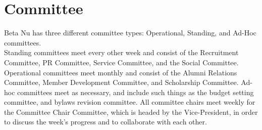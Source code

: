     \section*{Committee}
    
	Beta Nu has three different committee types: Operational, Standing, and Ad-Hoc committees. \\
	
	Standing committees meet every other week and consist of the Recruitment Committee, PR Committee, Service Committee, and the Social Committee. Operational committees meet monthly and consist of the Alumni Relations Committee, Member Development Committee, and Scholarship Committee. Ad-hoc committees meet as necessary, and include such things as the budget setting committee, and bylaws revision committee. All committee chairs meet weekly for the Committee Chair Committee, which is headed by the Vice-President, in order to discuss the week’s progress and to collaborate with each other.
	
